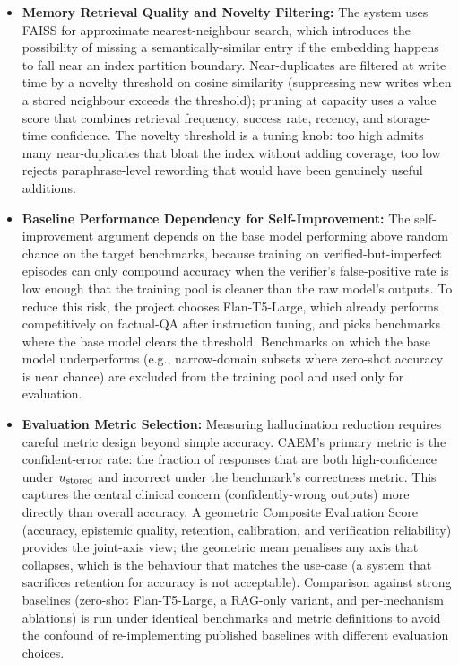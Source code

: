 \begin{itemize}
    \item \textbf{Memory Retrieval Quality and Novelty Filtering:} The system uses FAISS for approximate nearest-neighbour search, which introduces the possibility of missing a semantically-similar entry if the embedding happens to fall near an index partition boundary. Near-duplicates are filtered at write time by a novelty threshold on cosine similarity (suppressing new writes when a stored neighbour exceeds the threshold); pruning at capacity uses a value score that combines retrieval frequency, success rate, recency, and storage-time confidence. The novelty threshold is a tuning knob: too high admits many near-duplicates that bloat the index without adding coverage, too low rejects paraphrase-level rewording that would have been genuinely useful additions.

    \item \textbf{Baseline Performance Dependency for Self-Improvement:} The self-improvement argument depends on the base model performing above random chance on the target benchmarks, because training on verified-but-imperfect episodes can only compound accuracy when the verifier's false-positive rate is low enough that the training pool is cleaner than the raw model's outputs. To reduce this risk, the project chooses Flan-T5-Large, which already performs competitively on factual-QA after instruction tuning, and picks benchmarks where the base model clears the threshold. Benchmarks on which the base model underperforms (e.g., narrow-domain subsets where zero-shot accuracy is near chance) are excluded from the training pool and used only for evaluation.

    \item \textbf{Evaluation Metric Selection:} Measuring hallucination reduction requires careful metric design beyond simple accuracy. CAEM's primary metric is the confident-error rate: the fraction of responses that are both high-confidence under $u_{\text{stored}}$ and incorrect under the benchmark's correctness metric. This captures the central clinical concern (confidently-wrong outputs) more directly than overall accuracy. A geometric Composite Evaluation Score (accuracy, epistemic quality, retention, calibration, and verification reliability) provides the joint-axis view; the geometric mean penalises any axis that collapses, which is the behaviour that matches the use-case (a system that sacrifices retention for accuracy is not acceptable). Comparison against strong baselines (zero-shot Flan-T5-Large, a RAG-only variant, and per-mechanism ablations) is run under identical benchmarks and metric definitions to avoid the confound of re-implementing published baselines with different evaluation choices.
\end{itemize}

